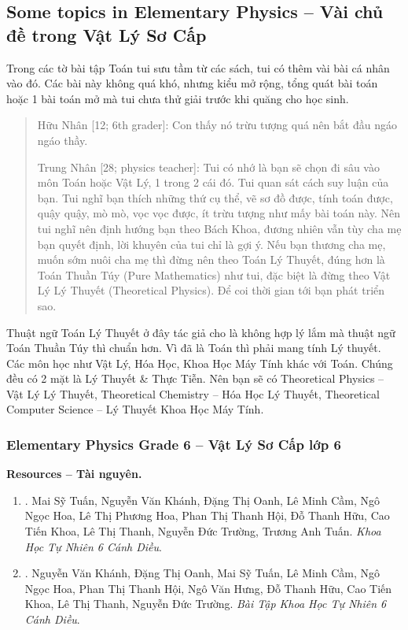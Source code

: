 \documentclass[12pt,twoside]{book}
\begin{document}

\subsection{Some topics in Elementary Physics -- Vài chủ đề trong Vật Lý Sơ Cấp}
Trong các tờ bài tập Toán tui sưu tầm từ các sách, tui có thêm vài bài cá nhân vào đó. Các bài này không quá khó, nhưng kiểu mở rộng, tổng quát bài toán hoặc 1 bài toán mở mà tui chưa thử giải trước khi quăng cho học sinh.

\begin{quote}
	{\sf Hữu Nhân [12; 6th grader]}: Con thấy nó trừu tượng quá nên bắt đầu ngáo ngáo thầy.
	\vspace{2mm}
	
	{\sf Trung Nhân [28; physics teacher]}: Tui có nhớ là bạn sẽ chọn đi sâu vào môn Toán hoặc Vật Lý, 1 trong 2 cái đó. Tui quan sát cách suy luận của bạn. Tui nghĩ bạn thích những thứ cụ thể, vẽ sơ đồ được, tính toán được, quậy quậy, mò mò, vọc vọc được, ít trừu tượng như mấy bài toán này. Nên tui nghĩ nên định hướng bạn theo Bách Khoa, đương nhiên vẫn tùy cha mẹ bạn quyết định, lời khuyên của tui chỉ là gợi ý. Nếu bạn thương cha mẹ, muốn sớm nuôi cha mẹ thì đừng nên theo Toán Lý Thuyết, đúng hơn là Toán Thuần Túy (Pure Mathematics) như tui, đặc biệt là đừng theo Vật Lý Lý Thuyết (Theoretical Physics). Để coi thời gian tới bạn phát triển sao.
\end{quote}
Thuật ngữ Toán Lý Thuyết ở đây tác giả cho là không hợp lý lắm mà thuật ngữ Toán Thuần Túy thì chuẩn hơn. Vì đã là Toán thì phải mang tính Lý thuyết. Các môn học như Vật Lý, Hóa Học, Khoa Học Máy Tính khác với Toán. Chúng đều có 2 mặt là Lý Thuyết \& Thực Tiễn. Nên bạn sẽ có Theoretical Physics -- Vật Lý Lý Thuyết, Theoretical Chemistry -- Hóa Học Lý Thuyết, Theoretical Computer Science -- Lý Thuyết Khoa Học Máy Tính.

\subsubsection{Elementary Physics Grade 6 -- Vật Lý Sơ Cấp lớp 6}
\textbf{\textsf{Resources -- Tài nguyên.}}
\begin{enumerate}
	\item \cite{SGK_KHTN_6_CD}. {\sc Mai Sỹ Tuấn, Nguyễn Văn Khánh, Đặng Thị Oanh, Lê Minh Cầm, Ngô Ngọc Hoa, Lê Thị Phương Hoa, Phan Thị Thanh Hội, Đỗ Thanh Hữu, Cao Tiến Khoa, Lê Thị Thanh, Nguyễn Đức Trường, Trương Anh Tuấn}. {\it Khoa Học Tự Nhiên 6 Cánh Diều}.
	
	\item \cite{SBT_KHTN_6_CD}. {\sc Nguyễn Văn Khánh, Đặng Thị Oanh, Mai Sỹ Tuấn, Lê Minh Cầm, Ngô Ngọc Hoa, Phan Thị Thanh Hội, Ngô Văn Hưng, Đỗ Thanh Hữu, Cao Tiến Khoa, Lê Thị Thanh, Nguyễn Đức Trường}. {\it Bài Tập Khoa Học Tự Nhiên 6 Cánh Diều}.
\end{enumerate}
\end{document}
